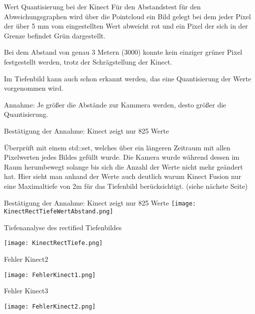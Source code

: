 \documentclass{VLKlauck}
\begin{document}
\begin{frame}{Wert Quantisierung bei der Kinect}
	Für den Abstandstest für den Abweichungsgraphen wird über die Pointcloud ein
	Bild gelegt bei dem jeder Pixel der über 5 mm vom eingestellten Wert
	abweicht rot und ein Pixel der sich in der Grenze befindet Grün dargestellt.

	Bei dem Abstand von genau 3 Metern (3000) konnte kein einziger grüner Pixel 
	festgestellt werden, trotz der Schrägstellung der Kinect.
	
	Im Tiefenbild kann auch schon erkannt werden, das eine Quantisierung der Werte
	vorgenommen wird.

	Annahme:	
	Je größer die Abstände zur Kammera werden, desto größer die Quantisierung.
	
\end {frame}

\begin{frame}{Bestätigung der Annahme: Kinect zeigt nur 825 Werte}

	 
	 Überprüft mit einem std::set, welches über ein längeren Zeitraum mit allen
	 Pixelwerten jedes Bildes gefüllt wurde. Die Kamera wurde während dessen im
	 Raum herumbewegt solange bis sich die Anzahl der Werte nicht mehr geändert
	 hat. Hier sieht man anhand der Werte auch deutlich warum Kinect Fusion nur
	 eine Maximaltiefe von 2m für das Tiefenbild berücksichtigt. (siehe nächste
	 Seite)

	 
	
\end {frame}


\begin{frame}{Bestätigung der Annahme: Kinect zeigt nur 825 Werte}
	\texttt{[image: KinectRectTiefeWertAbstand.png]}
\end{frame}

\begin{frame}{Tiefenanalyse des rectified Tiefenbildes}

	\texttt{[image: KinectRectTiefe.png]}

\end {frame}
	 
	 
\begin{frame}{Fehler Kinect2}

	\texttt{[image: FehlerKinect1.png]}

\end {frame}
	 
\begin{frame}{Fehler Kinect3}

	\texttt{[image: FehlerKinect2.png]}

\end {frame}	 
\end{document}
